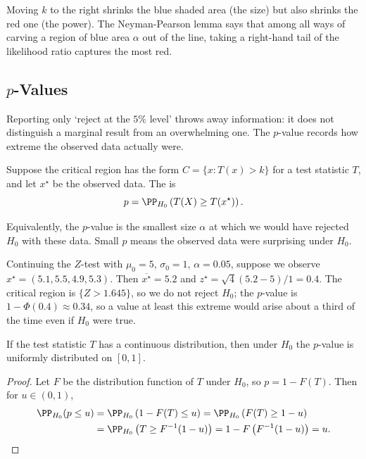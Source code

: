 Moving $k$ to the right shrinks the blue shaded area (the size) but also shrinks the red one (the power). The Neyman-Pearson lemma says that among all ways of carving a region of blue area $\alpha$ out of the line, taking a right-hand tail of the likelihood ratio captures the most red.

\subsection{\texorpdfstring{$p$}{p}-Values}

Reporting only `reject at the $5\%$ level' throws away information: it does not distinguish a marginal result from an overwhelming one. The $p$-value records how extreme the observed data actually were.

\begin{definition}[$p$-Value]
  Suppose the critical region has the form $C = \{x : T(x) > k\}$ for a test statistic $T$, and let $x^\star$ be the observed data. The  is
  $$
  p = \PP_{H_0}\left(T(X) \geq T(x^\star)\right).
  $$
\end{definition}

Equivalently, the $p$-value is the smallest size $\alpha$ at which we would have rejected $H_0$ with these data. Small $p$ means the observed data were surprising under $H_0$.

\begin{example}
  Continuing the $Z$-test with $\mu_0 = 5$, $\sigma_0 = 1$, $\alpha = 0.05$, suppose we observe $x^\star = (5.1, 5.5, 4.9, 5.3)$. Then $\overline{x^\star} = 5.2$ and $z^\star = \sqrt{4}(5.2 - 5)/1 = 0.4$. The critical region is $\{Z > 1.645\}$, so we do not reject $H_0$; the $p$-value is $1 - \Phi(0.4) \approx 0.34$, so a value at least this extreme would arise about a third of the time even if $H_0$ were true.
\end{example}

\begin{proposition}
  If the test statistic $T$ has a continuous distribution, then under $H_0$ the $p$-value is uniformly distributed on $[0,1]$.
\end{proposition}
\begin{proof}
  Let $F$ be the distribution function of $T$ under $H_0$, so $p = 1 - F(T)$. Then for $u \in (0,1)$,
  \begin{align*}
    \PP_{H_0}(p \leq u) &= \PP_{H_0}\left(1 - F(T) \leq u\right)= \PP_{H_0}\left(F(T) \geq 1-u\right)\\
    &= \PP_{H_0}\left(T \geq F^{-1}(1-u)\right) = 1 - F\left(F^{-1}(1-u)\right) = u. \qedhere
  \end{align*}
\end{proof}


